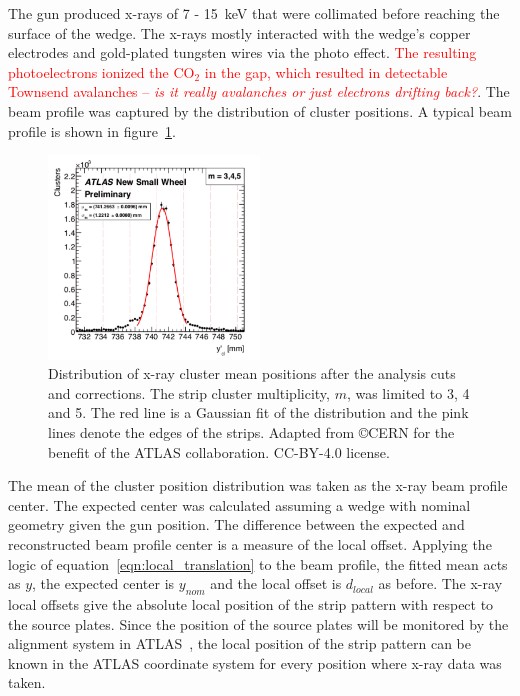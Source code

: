 
The gun produced x-rays of 7 - \SI{15}{\kilo\electronvolt} that were collimated before reaching the surface of the wedge. The x-rays mostly interacted with the wedge's copper electrodes and gold-plated tungsten wires via the photo effect. \textcolor{red}{The resulting photoelectrons ionized the CO$_2$ in the gap, which resulted in detectable Townsend avalanches -- \textit{is it really avalanches or just electrons drifting back?}}. The beam profile was captured by the distribution of cluster positions. A typical beam profile is shown in figure~\ref{fig:xray_beam_profile}.


\begin{figure}
    \centering
    \includegraphics[width = 0.5\textwidth]{figures/figure_xray_beam_profile.pdf}
    \caption{Distribution of x-ray cluster mean positions after the analysis cuts and corrections. The strip cluster multiplicity, $m$, was limited to 3, 4 and 5. The red line is a Gaussian fit of the distribution and the pink lines denote the edges of the strips. Adapted from \copyright CERN for the benefit of the ATLAS collaboration. CC-BY-4.0 license.}
    \label{fig:xray_beam_profile}
\end{figure}

The mean of the cluster position distribution was taken as the x-ray beam profile center. The expected center was calculated assuming a wedge with nominal geometry given the gun position. The difference between the expected and reconstructed beam profile center is a measure of the local offset. Applying the logic of equation~\ref{eqn:local_translation} to the beam profile, the fitted mean acts as $y$, the expected center is $y_{nom}$ and the local offset is $d_{local}$ as before. The x-ray local offsets  give the absolute local position of the strip pattern with respect to the source plates. Since the position of the source plates will be monitored by the alignment system in ATLAS~\cite{nsw_tdr}, the local position of the strip pattern can be known in the ATLAS coordinate system for every position where x-ray data was taken.

